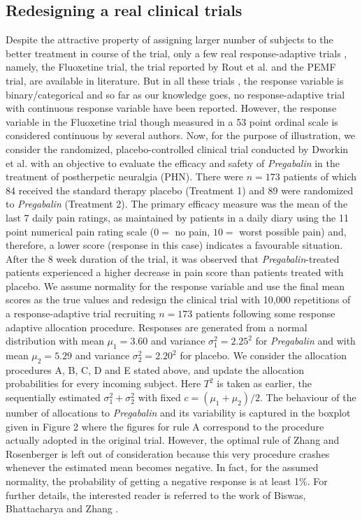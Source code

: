 \subsection{Redesigning a real clinical trials}

Despite the attractive property of assigning larger number of subjects
to the better treatment in course of the trial, only a few real response-adaptive trials , namely, the Fluoxetine trial\cite{22}, the trial reported by Rout et al.\cite{78} and  the PEMF trial\cite{79,80},  are available in literature. But in all these trials , the response variable is binary/categorical and so far as our knowledge goes, no response-adaptive trial with continuous response variable have been reported. However, the response variable in the Fluoxetine trial though measured in a 53 point ordinal scale is considered continuous by several authors\cite{58}. Now, for the purpose of illustration, we consider  the randomized, placebo-controlled clinical trial conducted by Dworkin et al.\cite{23} with an objective to evaluate the efficacy and safety of \textit{Pregabalin} in the treatment of postherpetic neuralgia (PHN). There were $n =173$ patients of which 84 received the standard therapy placebo (Treatment 1) and 89 were randomized to \textit{Pregabalin} (Treatment 2). The primary efficacy measure was the mean of the last 7 daily pain ratings, as maintained by patients in a daily diary using the 11 point numerical pain rating scale ($0=$ no pain, $10=$ worst possible pain) and, therefore, a lower score (response in this case) indicates a favourable situation. After the 8 week duration of the trial, it was observed that \textit{Pregabalin}-treated patients experienced a higher decrease in pain score than patients treated with placebo. We assume normality for the response variable and use the final mean scores as the true values  and redesign the clinical trial with 10,000 repetitions of a response-adaptive trial recruiting $n=173$ patients following some response adaptive allocation procedure. Responses are generated from a normal distribution with mean $\mu_{1}=3.60$ and variance $\sigma_{1}^{2} = 2.25^{2}$  for \textit{Pregabalin} and with mean $\mu_{2}=5.29$ and variance $\sigma_{2}^{2} = 2.20^{2}$  for placebo. We consider the  allocation procedures A, B, C, D and E stated above, and update the allocation probabilities for every incoming subject. Here $T^{2}$ is taken as earlier, the sequentially estimated $\sigma_{1}^{2}+\sigma_{2}^{2}$ with fixed $c=(\mu_{1}+\mu_{2})/2$.  The behaviour of the number of allocations to \textit{Pregabalin} and its variability is captured in the boxplot given in Figure 2 where the figures for rule A  correspond to the  procedure actually adopted in the original trial. However, the optimal rule of Zhang and Rosenberger\cite{24} is left out of consideration because this very procedure crashes whenever the estimated mean becomes negative. In fact, for the assumed normality, the probability of getting a negative response is at least 1\%. For further details, the interested reader is referred to the work of Biswas, Bhattacharya and Zhang\cite{42} .\newline


